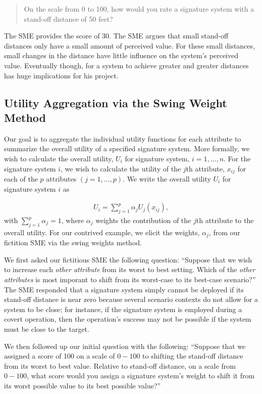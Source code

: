 \documentclass{article}
\begin{document}
\begin{quote}
  On the scale from 0 to 100, how would you rate a signature system with a
  stand-off distance of 50 feet?
\end{quote}




The SME provides the score of 30. The SME argues that
small stand-off distances only have a small amount of perceived value. For these
small distances, small changes in the distance have little influence on the
system's perceived value. Eventually though, for a system to achieve greater and
greater distances has huge implications for his project.

\subsection{Utility Aggregation via the Swing Weight Method}

Our goal is to aggregate the individual utility functions for each attribute to
summarize the overall utility of a specified signature system. More formally,
we wish to calculate the overall utility, $U_i$ for signature system,
$i = 1, \ldots, n$. For the signature system $i$, we wish to calculate the
utility of the $j$th attribute, $x_{ij}$ for each of the $p$ attributes
$(j = 1, \ldots, p)$. We write the overall utility $U_i$ for signature system
$i$ as

\begin{align}
  U_i = \sum_{j=1}^p \alpha_j U_j(x_{ij}),\label{eq:aggregate-utility}
\end{align}
with $\sum_{j=1}^p \alpha_j = 1$, where $\alpha_j$ weights the contribution of the $j$th
attribute to the overall utility. For our contrived example, we elicit the
weights, $\alpha_j$, from our fictition SME via the swing weights method.

We first asked our fictitious SME the following question: ``Suppose that we wish
to increase each \emph{other attribute} from its worst to best setting. Which
of the \emph{other attributes} is most imporant to shift from its worst-case to
its best-case scenario?'' The SME responded that a signature system simply cannot
be deployed if its stand-off distance is near zero because several scenario
contexts do not allow for a system to be close; for instance, if the signature
system is employed during a covert operation, then the operation's success may not
be possible if the system must be close to the target.

We then followed up our initial question with the following: ``Suppose that we
assigned a score of 100 on a scale of $0-100$ to shifting the stand-off distance
from its worst to best value. Relative to stand-off distance, on a scale from
$0-100$, what score would you assign a signature system's weight to shift it
from its worst possible value to its best possible value?''
\end{document}
